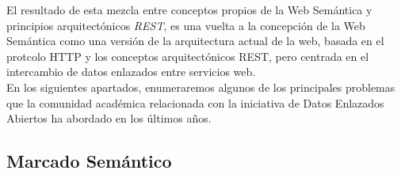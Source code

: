 El resultado de esta mezcla entre conceptos propios de la Web Sem\'antica y principios arquitect\'onicos \textit{REST}, es una vuelta a la concepci\'on de la Web Sem\'antica como una versi\'on de la arquitectura actual de la web, basada en el protcolo HTTP y los conceptos arquitect\'onicos REST, pero centrada en el intercambio de datos enlazados entre servicios web.\\
En los siguientes apartados, enumeraremos algunos de los principales problemas que la comunidad acad\'emica relacionada con la iniciativa de Datos Enlazados Abiertos ha abordado en los \'ultimos a\~nos.

\subsection{Marcado Sem\'antico}

